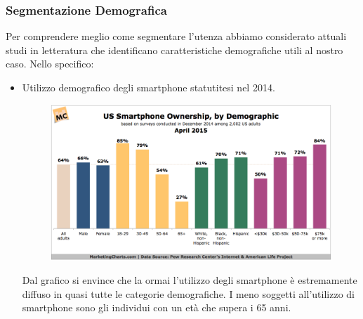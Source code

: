 \subsubsection{Segmentazione Demografica}
Per comprendere meglio come segmentare l'utenza abbiamo considerato
attuali studi in letteratura che identificano caratteristiche
demografiche utili al nostro caso.
Nello specifico:
\begin{itemize}
\item Utilizzo demografico degli smartphone statutitesi nel 2014.
\begin{figure} [H]
	\centering
	\includegraphics[scale=0.3]{img/demographic-smartphone.png}
\end{figure}
Dal grafico si envince che la ormai l'utilizzo degli smartphone è
estremamente diffuso in quasi tutte le categorie demografiche.
I meno soggetti all'utilizzo di smartphone sono gli individui con un età
che supera i 65 anni.


\end{itemize}
